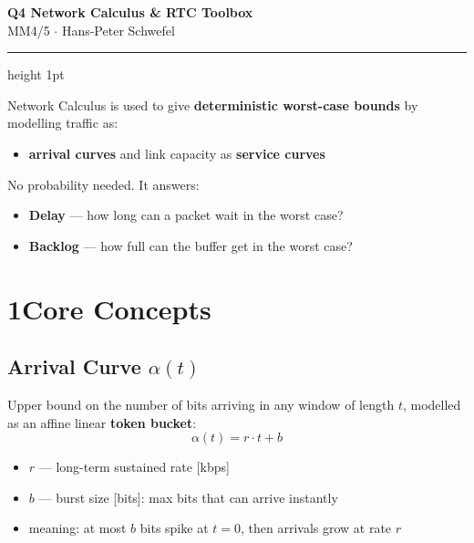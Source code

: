 \documentclass[10pt,a4paper]{article}
\begin{document}

\begin{center}
  {\large\bfseries\color{headernavy} Q4 \textemdash{} Network Calculus \& RTC Toolbox}\\[1pt]
  {\small MM4/5 $\cdot$ Hans-Peter Schwefel}
\end{center}
\vspace{1pt}\hrule height 1pt\vspace{5pt}

Network Calculus is used to give \textbf{deterministic worst-case bounds} by modelling traffic as:
\begin{itemize}
\item \textbf{arrival curves} and link capacity as \textbf{service curves}
\end{itemize}  
No probability needed. It answers:
\begin{itemize}
  \item \textbf{Delay} --- how long can a packet wait in the worst case?
  \item \textbf{Backlog} --- how full can the buffer get in the worst case?
\end{itemize}

\section*{1\quad Core Concepts}

\subsection*{Arrival Curve $\alpha(t)$}
Upper bound on the number of bits arriving in any window of length $t$, modelled as an affine linear \textbf{token bucket}:
\[
  \alpha(t) = r \cdot t + b
\]
\begin{itemize}
  \item $r$ --- long-term sustained rate [kbps]
  \item $b$ --- burst size [bits]: max bits that can arrive instantly
  \item meaning: at most $b$ bits spike at $t{=}0$, then arrivals grow at rate $r$
\end{itemize}
\end{document}
